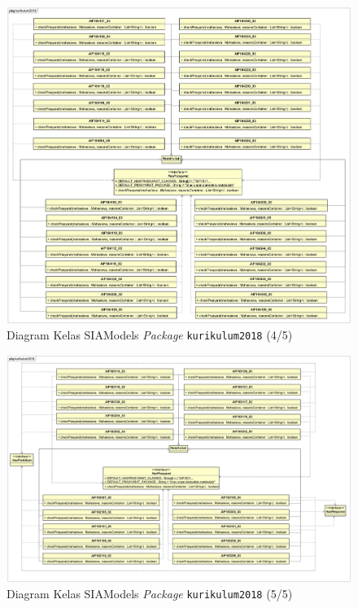 \begin{figure}[H]
\centering
\includegraphics[scale=0.135]{Gambar/class-diagram-siamodels-mk-kurikulum-2018-4}
\caption{Diagram Kelas SIAModels \textit{Package} \texttt{kurikulum2018} (4/5)}
\label{fig:siamodels_class_2018_kurikulum_4}
\end{figure}

\begin{figure}[H]
\centering
\includegraphics[scale=0.135]{Gambar/class-diagram-siamodels-mk-kurikulum-2018-5}
\caption{Diagram Kelas SIAModels \textit{Package} \texttt{kurikulum2018} (5/5)}
\label{fig:siamodels_class_2018_kurikulum_5}
\end{figure}

